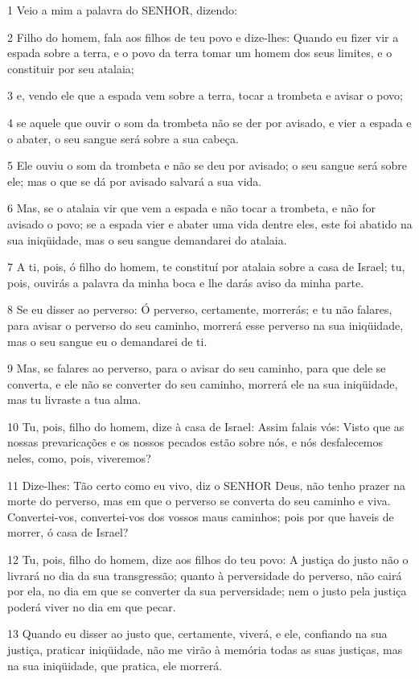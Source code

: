 \par 1 Veio a mim a palavra do SENHOR, dizendo:
\par 2 Filho do homem, fala aos filhos de teu povo e dize-lhes: Quando eu fizer vir a espada sobre a terra, e o povo da terra tomar um homem dos seus limites, e o constituir por seu atalaia;
\par 3 e, vendo ele que a espada vem sobre a terra, tocar a trombeta e avisar o povo;
\par 4 se aquele que ouvir o som da trombeta não se der por avisado, e vier a espada e o abater, o seu sangue será sobre a sua cabeça.
\par 5 Ele ouviu o som da trombeta e não se deu por avisado; o seu sangue será sobre ele; mas o que se dá por avisado salvará a sua vida.
\par 6 Mas, se o atalaia vir que vem a espada e não tocar a trombeta, e não for avisado o povo; se a espada vier e abater uma vida dentre eles, este foi abatido na sua iniqüidade, mas o seu sangue demandarei do atalaia.
\par 7 A ti, pois, ó filho do homem, te constituí por atalaia sobre a casa de Israel; tu, pois, ouvirás a palavra da minha boca e lhe darás aviso da minha parte.
\par 8 Se eu disser ao perverso: Ó perverso, certamente, morrerás; e tu não falares, para avisar o perverso do seu caminho, morrerá esse perverso na sua iniqüidade, mas o seu sangue eu o demandarei de ti.
\par 9 Mas, se falares ao perverso, para o avisar do seu caminho, para que dele se converta, e ele não se converter do seu caminho, morrerá ele na sua iniqüidade, mas tu livraste a tua alma.
\par 10 Tu, pois, filho do homem, dize à casa de Israel: Assim falais vós: Visto que as nossas prevaricações e os nossos pecados estão sobre nós, e nós desfalecemos neles, como, pois, viveremos?
\par 11 Dize-lhes: Tão certo como eu vivo, diz o SENHOR Deus, não tenho prazer na morte do perverso, mas em que o perverso se converta do seu caminho e viva. Convertei-vos, convertei-vos dos vossos maus caminhos; pois por que haveis de morrer, ó casa de Israel?
\par 12 Tu, pois, filho do homem, dize aos filhos do teu povo: A justiça do justo não o livrará no dia da sua transgressão; quanto à perversidade do perverso, não cairá por ela, no dia em que se converter da sua perversidade; nem o justo pela justiça poderá viver no dia em que pecar.
\par 13 Quando eu disser ao justo que, certamente, viverá, e ele, confiando na sua justiça, praticar iniqüidade, não me virão à memória todas as suas justiças, mas na sua iniqüidade, que pratica, ele morrerá.

